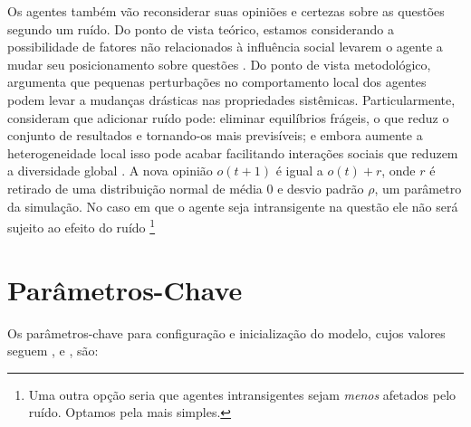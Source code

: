 Os agentes também vão reconsiderar suas opiniões e certezas sobre as questões
segundo um ruído. Do ponto de vista teórico, estamos considerando a
possibilidade de fatores não relacionados à influência social levarem o agente a
mudar seu posicionamento sobre questões \cite{flache2017, lorenz2017modeling}.
Do ponto de vista metodológico,  argumenta que
pequenas perturbações no comportamento local dos agentes podem levar a mudanças
drásticas nas propriedades sistêmicas. Particularmente, consideram que adicionar
ruído pode: eliminar equilíbrios frágeis, o que reduz o conjunto de resultados e
tornando-os mais previsíveis; e embora aumente a heterogeneidade local isso pode
acabar facilitando interações sociais que reduzem a diversidade global
\cite[p.323]{macy2015signal}. A nova opinião \(o(t+1)\) é igual a \(o(t) + r\),
onde \(r\) é retirado de uma distribuição normal de média 0 e desvio padrão
\(\rho\), um parâmetro da simulação. No caso em que o agente seja
intransigente na questão ele não será sujeito ao efeito do ruído \footnote{Uma
  outra opção seria que agentes intransigentes sejam \textit{menos} afetados
  pelo ruído. Optamos pela mais simples.}


\section{Parâmetros-Chave}

Os parâmetros-chave para configuração e inicialização do modelo, cujos valores
seguem ,  e
, são:

